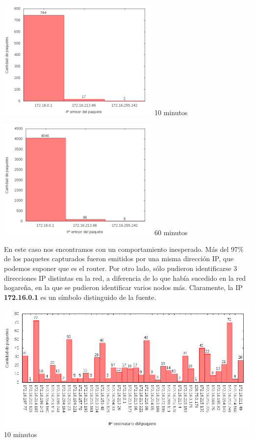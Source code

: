 \begin{minipage}{8cm}
  \centering
  \includegraphics[width=8cm]{../mediciones/altop-wifi-10/altop10IpsSrcArp.png}
  10 minutos
\end{minipage}%
\begin{minipage}{8cm}
  \centering
  \includegraphics[width=8cm]{../mediciones/altop-wifi-60/altop60IpsSrcArp.png}
  60 minutos
\end{minipage}


En este caso nos encontramos con un comportamiento inesperado. Más del 97\% de los paquetes capturados fueron emitidos por una misma dirección
IP, que podemos suponer que es el router. Por otro lado, sólo pudieron identificarse 3 direcciones IP distintas en la red, a diferencia de lo
que había sucedido en la red hogareña, en la que se pudieron identificar varios nodos más. Claramente, la IP \textbf{172.16.0.1} es un símbolo
distinguido de la fuente.

\begin{center}
\includegraphics[width=16cm]{../mediciones/altop-wifi-10/altop10IpsDstArp.png}
10 minutos
\end{center}

